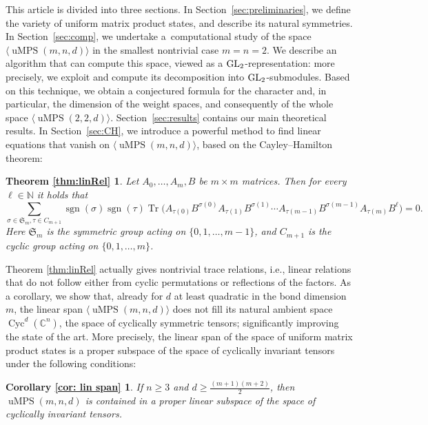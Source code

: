 \documentclass[pdftex]{sigma}
\numberwithin{equation}{section}
\DeclareMathOperator{\Tr}{Tr}
\DeclareMathOperator{\sgn}{sgn}
\newcommand{\CC}{\mathbb{C}}
\DeclareMathOperator{\uMPS}{uMPS}
\DeclareMathOperator{\Cyc}{Cyc}
\begin{document}
This article is divided into three sections. In Section~\ref{sec:preliminaries}, we define the variety of uniform matrix product states, and describe its natural symmetries.
In Section~\ref{sec:comp}, we undertake a~computational study of the space $\langle\uMPS(m,n,d)\rangle$ in the smallest nontrivial case ${m=n=2}$. We describe an algorithm that can compute this space, viewed as a ${\rm GL}_2$-representation: more precisely, we exploit and compute its decomposition into ${\rm GL}_2$-submodules. Based on this technique, we obtain a conjectured formula for the character and, in particular, the dimension of the weight spaces, and consequently of the whole space $\langle\uMPS(2,2,d)\rangle$.
Section~\ref{sec:results} contains our main theoretical results.
In Section~\ref{sec:CH}, we introduce a powerful method to find linear equations that vanish on $\langle\uMPS(m,n,d)\rangle$, based on the Cayley--Hamilton theorem:
	\theoremstyle{plain}
	\newtheorem*{thm:linRel}{Theorem \ref{thm:linRel}}
	\begin{thm:linRel}
		Let $A_0,\dots,A_m,B$ be $m \times m$ matrices. Then for every $\ell \in {\mathbb N}$ it holds that
		\begin{equation*}
			\sum_{\sigma \in \mathfrak{S}_m, \tau \in C_{m+1}} \sgn(\sigma)\sgn(\tau)\Tr\big(A_{\tau(0)}B^{\sigma(0)}A_{\tau(1)}B^{\sigma(1)} \cdots A_{\tau(m-1)}B^{\sigma(m-1)}A_{\tau(m)}B^{\ell}\big) =0.
		\end{equation*}
		Here $\mathfrak{S}_m$ is the symmetric group acting on $\{0,1,\dots,m-1\}$, and $C_{m+1}$ is the cyclic group acting on $\{0,1,\dots,m\}$.
	\end{thm:linRel}
	Theorem \ref{thm:linRel} actually gives nontrivial trace relations, i.e., linear relations that do not follow either from cyclic permutations or reflections of the factors.
	As a corollary, we show that, already for $d$ at least quadratic in the bond dimension $m$, the linear span $\langle\uMPS(m,n,d)\rangle$ does not fill its natural ambient space $\Cyc^d(\CC^n)$, the space of cyclically symmetric tensors; significantly improving the state of the art.
	More precisely, the linear span of the space of uniform matrix product states is a proper subspace of the space of cyclically invariant tensors %
	under the following conditions: %
	\theoremstyle{plain}
	\newtheorem*{cor: lin span}{Corollary \ref{cor: lin span}}
	\begin{cor: lin span}
		If $n \geq 3$ and $d \geq \frac{(m+1)(m+2)}{2}$, then ${\uMPS(m,n,d)}$ is contained in a proper linear subspace of the space of cyclically invariant tensors.
	\end{cor: lin span}
\end{document}
